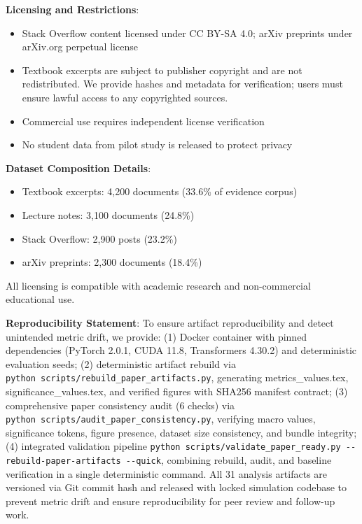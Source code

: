 \textbf{Licensing and Restrictions}:

\begin{itemize}
\item
  Stack Overflow content licensed under CC BY-SA 4.0; arXiv preprints under arXiv.org perpetual license
\item
  Textbook excerpts are subject to publisher copyright and are not redistributed. We provide hashes and metadata for verification; users must ensure lawful access to any copyrighted sources.
\item
  Commercial use requires independent license verification
\item
  No student data from pilot study is released to protect privacy
\end{itemize}

\textbf{Dataset Composition Details}:

\begin{itemize}
\item
  Textbook excerpts: 4,200 documents (33.6\% of evidence corpus)
\item
  Lecture notes: 3,100 documents (24.8\%)
\item
  Stack Overflow: 2,900 posts (23.2\%)
\item
  arXiv preprints: 2,300 documents (18.4\%)
\end{itemize}

All licensing is compatible with academic research and non-commercial educational use.

\textbf{Reproducibility Statement}: To ensure artifact reproducibility and detect unintended metric drift, we provide: (1) Docker container with pinned dependencies (PyTorch 2.0.1, CUDA 11.8, Transformers 4.30.2) and deterministic evaluation seeds; (2) deterministic artifact rebuild via \texttt{python\ scripts/rebuild\_paper\_artifacts.py}, generating metrics\_values.tex, significance\_values.tex, and verified figures with SHA256 manifest contract; (3) comprehensive paper consistency audit (6 checks) via \texttt{python\ scripts/audit\_paper\_consistency.py}, verifying macro values, significance tokens, figure presence, dataset size consistency, and bundle integrity; (4) integrated validation pipeline \texttt{python\ scripts/validate\_paper\_ready.py\ -\/-rebuild-paper-artifacts\ -\/-quick}, combining rebuild, audit, and baseline verification in a single deterministic command. All 31 analysis artifacts are versioned via Git commit hash and released with locked simulation codebase to prevent metric drift and ensure reproducibility for peer review and follow-up work.

